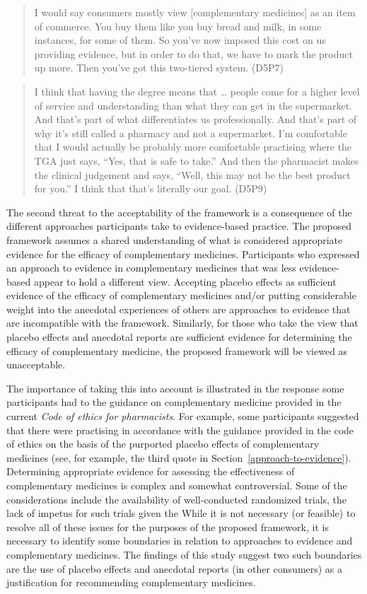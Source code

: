 \documentclass[11pt,a4paper]{article}
\begin{document}
\begin{quote}
I would say consumers mostly view {[}complementary medicines{]} as an
item of commerce. You buy them like you buy bread and milk, in some
instances, for some of them. So you've now imposed this cost on us
providing evidence, but in order to do that, we have to mark the product
up more. Then you've got this two-tiered system. (D5P7)
\end{quote}

\begin{quote}
I think that having the degree means that \ldots{} people come for a
higher level of service and understanding than what they can get in the
supermarket. And that's part of what differentiates us professionally.
And that's part of why it's still called a pharmacy and not a
supermarket. I'm comfortable that I would actually be probably more
comfortable practising where the TGA just says, ``Yes, that is safe to
take.'' And then the pharmacist makes the clinical judgement and says,
``Well, this may not be the best product for you.'' I think that that's
literally our goal. (D5P9)
\end{quote}

The second threat to the acceptability of the framework is a consequence
of the different approaches participants take to evidence-based
practice. The proposed framework assumes a shared understanding of what
is considered appropriate evidence for the efficacy of complementary
medicines. Participants who expressed an approach to evidence in
complementary medicines that was less evidence-based appear to hold a
different view. Accepting placebo effects as sufficient evidence of the
efficacy of complementary medicines and/or putting considerable weight
into the anecdotal experiences of others are approaches to evidence that
are incompatible with the framework. Similarly, for those who take the
view that placebo effects and anecdotal reports are sufficient evidence
for determining the efficacy of complementary medicine, the proposed
framework will be viewed as unacceptable.

The importance of taking this into account is illustrated in the
response some participants had to the guidance on complementary medicine
provided in the current \emph{Code of ethics for pharmacists}. For
example, some participants suggested that there were practising in
accordance with the guidance provided in the code of ethics on the basis
of the purported placebo effects of complementary medicines (see, for
example, the third quote in Section~\ref{approach-to-evidence}).
Determining appropriate evidence for assessing the effectiveness of
complementary medicines is complex and somewhat controversial. Some of
the considerations include the availability of well-conducted randomized
trials, the lack of impetus for such trials given the While it is not
necessary (or feasible) to resolve all of these issues for the purposes
of the proposed framework, it is necessary to identify some boundaries
in relation to approaches to evidence and complementary medicines. The
findings of this study suggest two such boundaries are the use of
placebo effects and anecdotal reports (in other consumers) as a
justification for recommending complementary medicines.
\end{document}
